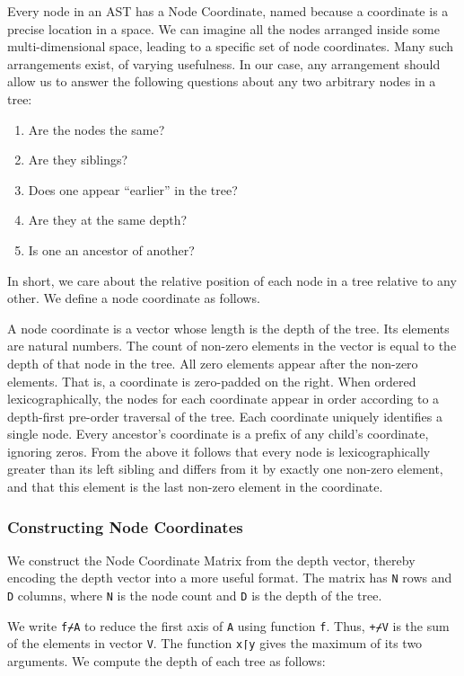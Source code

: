 \documentclass[numbers,preprint]{sigplanconf}
\begin{document}
Every node in an AST has a Node Coordinate, named because a coordinate
is a precise location in a space.  We can imagine all the nodes
arranged inside some multi-dimensional space, leading to a specific
set of node coordinates. Many such arrangements exist, of varying
usefulness. In our case, any arrangement should allow us to answer
the following questions about any two arbitrary nodes in a tree:

\begin{enumerate}[noitemsep]
\item Are the nodes the same?
\item Are they siblings?
\item Does one appear ``earlier'' in the tree?
\item Are they at the same depth?
\item Is one an ancestor of another?
\end{enumerate}

\noindent
In short, we care about the relative position of each node in a tree
relative to any other. We define a node coordinate as follows.

A node coordinate is a vector whose length is the depth of the
tree. Its elements are natural numbers.  The count of non-zero elements
in the vector is equal to the depth of that node in the tree. All zero
elements appear after the non-zero elements. That is, a coordinate
is zero-padded on the right. When ordered lexicographically, the
nodes for each coordinate appear in order according to a depth-first
pre-order traversal of the tree. Each coordinate uniquely identifies a
single node. Every ancestor’s coordinate is a prefix of any child’s
coordinate, ignoring zeros. From the above it follows that every node
is lexicographically greater than its left sibling and differs from
it by exactly one non-zero element, and that this element is the last
non-zero element in the coordinate.


\subsubsection{Constructing Node Coordinates}

We construct the Node Coordinate Matrix from the depth vector, thereby encoding 
the depth vector into a more useful format. The matrix has \verb;N; rows and 
\verb;D; columns, where \verb;N; is the node count and \verb;D; is the depth 
of the tree.

We write \verb;f⌿A; to reduce the first axis of \verb;A; using function \verb;f;. Thus,
\verb;+⌿V; is the sum of the elements in vector \verb;V;. The function \verb;x⌈y;
gives the maximum of its two arguments.
We compute the depth of each tree as follows:
\end{document}

